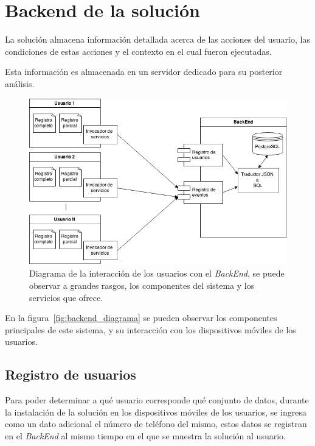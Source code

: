 \section{Backend de la solución}

La solución almacena información detallada acerca de las acciones del usuario,
las condiciones de estas acciones y el contexto en el cual fueron ejecutadas.

Esta información es almacenada en un servidor dedicado para su posterior
análisis.

\begin{figure}[ht]
\centering
\includegraphics[scale=0.5]{solucion/images/backend_diagrama.png}
\caption{Diagrama de la interacción de los usuarios con el \textit{BackEnd}, se
    puede observar a grandes rasgos, los componentes del sistema y los servicios
    que ofrece.}
\label{fig:backend_diagrama2}
\end{figure}

En la figura~\ref{fig:backend_diagrama} se pueden observar los componentes
principales de este sistema, y su interacción con los dispositivos móviles de
los usuarios. 

\subsection{Registro de usuarios}

Para poder determinar a qué usuario corresponde qué conjunto de datos, durante la
instalación de la solución en los dispositivos móviles de los usuarios, se ingresa como
un dato adicional el número de teléfono del mismo, estos datos se registran
en el \textit{BackEnd} al mismo tiempo en el que se muestra la solución al usuario.

